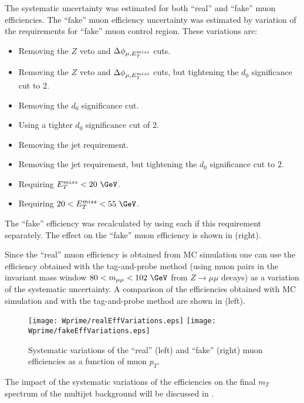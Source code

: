 The systematic uncertainty was estimated for both ``real'' and ``fake'' muon efficiencies.
The ``fake'' muon efficiency uncertainty was estimated by variation of the requirements for ``fake'' muon control region. These variations are:
\begin{itemize}
\item Removing the $Z$ veto and $\Delta\phi_{\mu,E_T^{miss}}$ cuts.
\item Removing the $Z$ veto and $\Delta\phi_{\mu,E_T^{miss}}$ cuts, but tightening the $d_0$ significance cut to $2$.
\item Removing the $d_0$ significance cut. 
\item Using a tighter $d_0$ significance cut of $2$.
\item Removing the jet requirement.
\item Removing the jet requirement, but tightening the $d_0$ significance
cut to $2$.
\item Requiring $\met < 20~\GeV$.
\item Requiring $20 < \met < 55~\GeV$.
\end{itemize}
The ``fake'' efficiency was recalculated by using each if this requirement separately.
The effect on the ``fake'' muon efficiency is shown in  (right).

Since the ``real'' muon efficiency is obtained from MC simulation one can use the efficiency obtained with the tag-and-probe method (using muon pairs in the invariant mass window $80 < m_{\mu\mu} < 102~\GeV$ from $Z\to\mu\mu$ decays) as a variation of the systematic uncertainty. 
A comparison of the efficiencies obtained with MC simulation and with the tag-and-probe method are shown in  (left).

\begin{figure}[]
  \centering
  \texttt{[image: Wprime/realEffVariations.eps]}
  \texttt{[image: Wprime/fakeEffVariations.eps]}
  \caption{Systematic variations of the ``real'' (left) and ``fake'' (right) muon efficiencies as a function of muon $p_T$.}
  \label{fig:matrix_method_systematics}
\end{figure}

The impact of the systematic variations of the efficiencies on the final $m_T$ spectrum of the multijet background will be discussed in .



